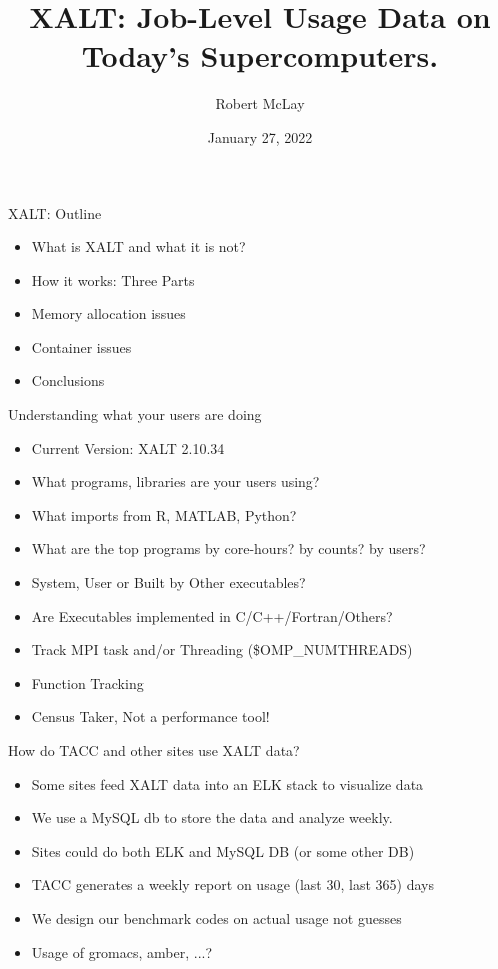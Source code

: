 \documentclass{beamer}
\begin{document}
\title[XALT]{XALT: Job-Level Usage Data on Today's Supercomputers.}
\author{Robert McLay} 
\date{January 27, 2022}

\frame{\titlepage} 

\begin{frame}{XALT: Outline}
  \begin{itemize}
    \item What is XALT and what it is not?
    \item How it works: Three Parts
    \item Memory allocation issues
    \item Container issues
    \item Conclusions
  \end{itemize}
\end{frame}

\begin{frame}{Understanding what your users are doing}
  \begin{itemize}
    \item Current Version: XALT 2.10.34
    \item What programs, libraries are your users using?
    \item What imports from R, MATLAB, Python?
    \item What are the top programs by core-hours? by counts? by users?
    \item System, User or Built by Other executables?
    \item Are Executables implemented in C/C++/Fortran/Others?
    \item Track MPI task and/or Threading (\$OMP\_NUMTHREADS)
    \item Function Tracking
    \item Census Taker, Not a performance tool!
  \end{itemize}
\end{frame}

\begin{frame}{How do TACC and other sites use XALT data?}
  \begin{itemize}
    \item Some sites feed XALT data into an ELK stack to visualize data
    \item We use a MySQL db to store  the data and analyze weekly.
    \item Sites could do both ELK and MySQL DB (or some other DB)
    \item TACC generates a weekly report on usage (last 30, last 365) days
    \item We design our benchmark codes on actual usage not guesses
    \item Usage of gromacs, amber, ...?
  \end{itemize}
\end{frame}
\end{document}
